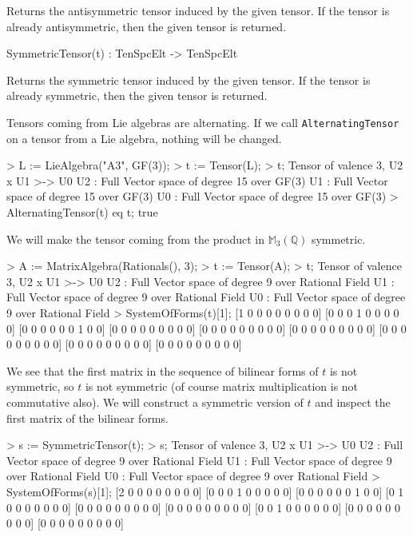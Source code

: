 Returns the antisymmetric tensor induced by the given tensor. If 
the tensor is already antisymmetric, then the given tensor is returned.

\begin{intrinsics}
SymmetricTensor(t) : TenSpcElt -> TenSpcElt
\end{intrinsics}

Returns the symmetric tensor induced by the given tensor. If the tensor is 
already symmetric, then the given tensor is returned.

\begin{example}[AlternatingTensor]

Tensors coming from Lie algebras are alternating.
If we call \texttt{AlternatingTensor} on a tensor from a Lie algebra, nothing will be changed.
\begin{code}
> L := LieAlgebra("A3", GF(3));
> t := Tensor(L);
> t;
Tensor of valence 3, U2 x U1 >-> U0
U2 : Full Vector space of degree 15 over GF(3)
U1 : Full Vector space of degree 15 over GF(3)
U0 : Full Vector space of degree 15 over GF(3)
> AlternatingTensor(t) eq t;
true
\end{code}
\end{example}

\begin{example}[MakeSymmetric]

We will make the tensor coming from the product in $\mathbb{M}_3(\mathbb{Q})$ symmetric.
\begin{code}
> A := MatrixAlgebra(Rationals(), 3);
> t := Tensor(A);
> t;
Tensor of valence 3, U2 x U1 >-> U0
U2 : Full Vector space of degree 9 over Rational Field
U1 : Full Vector space of degree 9 over Rational Field
U0 : Full Vector space of degree 9 over Rational Field
> SystemOfForms(t)[1];
[1 0 0 0 0 0 0 0 0]
[0 0 0 1 0 0 0 0 0]
[0 0 0 0 0 0 1 0 0]
[0 0 0 0 0 0 0 0 0]
[0 0 0 0 0 0 0 0 0]
[0 0 0 0 0 0 0 0 0]
[0 0 0 0 0 0 0 0 0]
[0 0 0 0 0 0 0 0 0]
[0 0 0 0 0 0 0 0 0]
\end{code}

We see that the first matrix in the sequence of bilinear forms of $t$ is not
symmetric, so $t$ is not symmetric (of course matrix multiplication is not
commutative also). We will construct a symmetric version of $t$ and inspect the
first matrix of the bilinear forms.
\begin{code}
> s := SymmetricTensor(t);
> s;
Tensor of valence 3, U2 x U1 >-> U0
U2 : Full Vector space of degree 9 over Rational Field
U1 : Full Vector space of degree 9 over Rational Field
U0 : Full Vector space of degree 9 over Rational Field
> SystemOfForms(s)[1];
[2 0 0 0 0 0 0 0 0]
[0 0 0 1 0 0 0 0 0]
[0 0 0 0 0 0 1 0 0]
[0 1 0 0 0 0 0 0 0]
[0 0 0 0 0 0 0 0 0]
[0 0 0 0 0 0 0 0 0]
[0 0 1 0 0 0 0 0 0]
[0 0 0 0 0 0 0 0 0]
[0 0 0 0 0 0 0 0 0]
\end{code}
\end{example}


